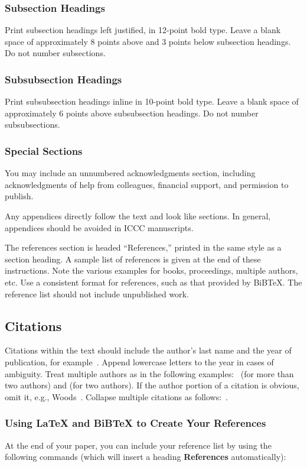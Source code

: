 \documentclass[letterpaper]{article}
\begin{document}
\subsubsection{Subsection Headings}
Print subsection headings left justified, in 12-point bold type. Leave a blank space
of approximately 8 points above and 3 points below subsection
headings. Do not number subsections.

\subsubsection{Subsubsection Headings}
Print subsubsection headings inline in 10-point bold type. Leave a blank
space of approximately 6 points above subsubsection headings. Do not
number subsubsections.

\subsubsection{Special Sections}
You may include an unnumbered acknowledgments section, including
acknowledgments of help from colleagues, financial support, and
permission to publish.

Any appendices directly follow the text and look like sections.  In general, appendices should 
be avoided in ICCC manuscripts.

The references section is headed ``References,'' printed in the same
style as a section heading. A sample list of
references is given at the end of these instructions.  Note the various examples for books, proceedings, multiple authors, etc. Use a consistent
format for references, such as that provided by BiB\TeX{}. The reference
list should not include unpublished work.

\subsection{Citations}
Citations within the text should include the author's last name and
the year of publication, for example~\cite{boden92}.  Append
lowercase letters to the year in cases of ambiguity.  Treat multiple
authors as in the following examples:~\cite{lyu04}
(for more than two authors) and
\cite{veale07} (for two authors).  If the author
portion of a citation is obvious, omit it, e.g.,
Woods~.  Collapse multiple citations as
follows:~\cite{UCI,Ruch07,OZ}.

\subsubsection{Using \LaTeX{} and BiBTeX to Create Your References}
At the end of your paper, you can include your reference list by using the following commands (which will insert a heading \textbf{References} automatically):
\end{document}
